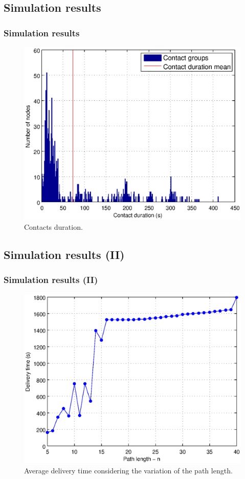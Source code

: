 \documentclass[compress,red]{beamer}
\begin{document}
\subsection{Simulation results}
\begin{frame}
\frametitle{Simulation results}
\begin{figure}
\centering \includegraphics[width=.7\linewidth]{../paper/imgs/statistics/contacts-duration}
\caption{Contacts duration.}
\end{figure}
\end{frame}

\subsection{Simulation results (II)}
\begin{frame}
\frametitle{Simulation results (II)}
\begin{figure}
\centering \includegraphics[width=.7\linewidth]{../paper/imgs/statistics/ntime-data}
\caption{Average delivery time considering the variation of the path length.}
\end{figure}
\end{frame}
\end{document}
